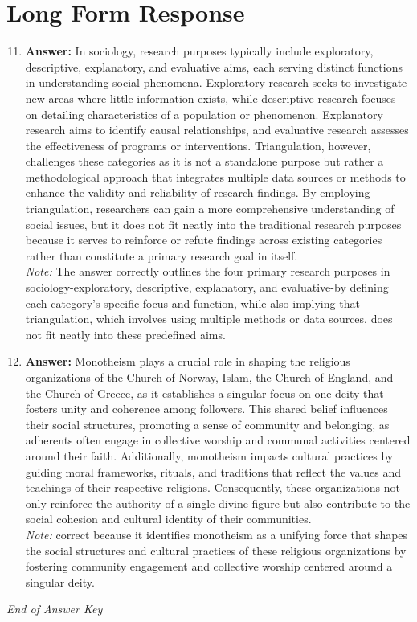 \documentclass[12pt]{article}
\begin{document}
\section*{Long Form Response}
\begin{enumerate}[label=\arabic*.]
\setcounter{enumi}{10}
\item \textbf{Answer:} In sociology, research purposes typically include exploratory, descriptive, explanatory, and evaluative aims, each serving distinct functions in understanding social phenomena. Exploratory research seeks to investigate new areas where little information exists, while descriptive research focuses on detailing characteristics of a population or phenomenon. Explanatory research aims to identify causal relationships, and evaluative research assesses the effectiveness of programs or interventions. Triangulation, however, challenges these categories as it is not a standalone purpose but rather a methodological approach that integrates multiple data sources or methods to enhance the validity and reliability of research findings. By employing triangulation, researchers can gain a more comprehensive understanding of social issues, but it does not fit neatly into the traditional research purposes because it serves to reinforce or refute findings across existing categories rather than constitute a primary research goal in itself.
\\ \textit{Note:} The answer correctly outlines the four primary research purposes in sociology-exploratory, descriptive, explanatory, and evaluative-by defining each category's specific focus and function, while also implying that triangulation, which involves using multiple methods or data sources, does not fit neatly into these predefined aims.
\item \textbf{Answer:} Monotheism plays a crucial role in shaping the religious organizations of the Church of Norway, Islam, the Church of England, and the Church of Greece, as it establishes a singular focus on one deity that fosters unity and coherence among followers. This shared belief influences their social structures, promoting a sense of community and belonging, as adherents often engage in collective worship and communal activities centered around their faith. Additionally, monotheism impacts cultural practices by guiding moral frameworks, rituals, and traditions that reflect the values and teachings of their respective religions. Consequently, these organizations not only reinforce the authority of a single divine figure but also contribute to the social cohesion and cultural identity of their communities.
\\ \textit{Note:} correct because it identifies monotheism as a unifying force that shapes the social structures and cultural practices of these religious organizations by fostering community engagement and collective worship centered around a singular deity.
\end{enumerate}

\vfill
\noindent\textit{End of Answer Key}
\end{document}
